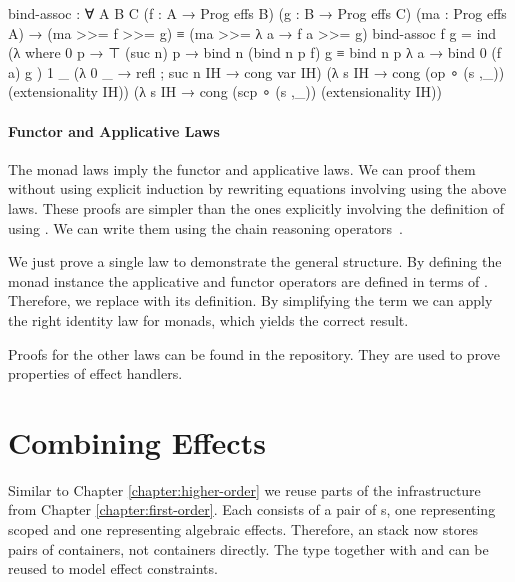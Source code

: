 \begin{code}
bind-assoc : ∀ {A B C}
  (f : A → Prog effs B) (g : B → Prog effs C) (ma : Prog effs A) →
  (ma >>= f >>= g) ≡ (ma >>= λ a → f a >>= g)
bind-assoc f g = ind
  (λ where
    0 p        → ⊤
    (suc n) p  → bind n (bind n p f) g ≡ bind n p λ a → bind 0 (f a) g
  ) 1 _
  (λ{ {0} _ → refl ; {suc n} IH → cong var IH})
  (λ s IH → cong (op   ∘ (s ,_)) (extensionality IH))
  (λ s IH → cong (scp  ∘ (s ,_)) (extensionality IH))
\end{code}

\paragraph{Functor and Applicative Laws}
The monad laws imply the functor and applicative laws.
We can proof them without using explicit induction by rewriting equations
involving \AgdaFunction{>>=} using the above laws.
These proofs are simpler than the ones explicitly involving the definition of
\AgdaFunction{>>=} using .
We can write them using the chain reasoning operators~\cite{norell:thesis}.

We just prove a single law to demonstrate the general structure.
By defining the monad instance the applicative and functor operators are 
defined in terms of \AgdaFunction{>>=}.
Therefore, we replace \AgdaFunction{<\$>} with its definition.
By simplifying the term we can apply the right identity law for monads, which
yields the correct result.

Proofs for the other laws can be found in the repository.
They are used to prove properties of effect handlers.


\section{Combining Effects}

Similar to Chapter \ref{chapter:higher-order} we reuse parts of the
infrastructure from Chapter \ref{chapter:first-order}.
Each  consists of a pair of s, one
representing scoped and one representing algebraic effects.
Therefore, an  stack now stores pairs of containers, not
containers directly.
The type  together with  and
 can be reused to model effect constraints.

